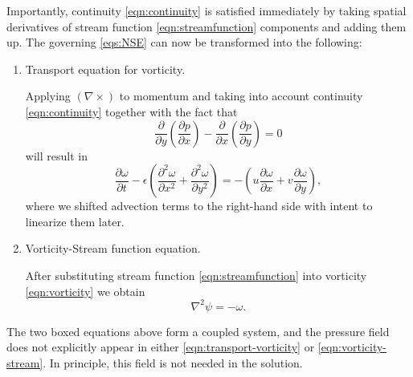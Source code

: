 \documentclass{article}
\numberwithin{equation}{section}
\begin{document}
	Importantly, continuity \cref{eqn:continuity} is satisfied immediately by taking spatial derivatives of stream function \cref{eqn:streamfunction} components and adding them up. The governing \cref{eqs:NSE} can now be transformed into the following:
	\begin{enumerate}
		\item 
			Transport equation for vorticity.
			
			Applying $(\nabla \times)$ to momentum and taking into account continuity \cref{eqn:continuity} together with the fact that
			\begin{equation}
				\frac{\partial}{\partial y}\left(\frac{\partial p}{\partial x}\right) - 
				\frac{\partial}{\partial x}\left(\frac{\partial p}{\partial y}\right)=0
			\end{equation}
			will result in
			\begin{equation}
			\label{eqn:transport-vorticity}
				\boxed{
				\frac{\partial\omega}{\partial t} -\epsilon \left(\frac{\partial ^2 \omega}{\partial x^2} 
				+ \frac{\partial^2 \omega}{\partial y^2} \right)
				=-\left( u \frac{\partial\omega}{\partial x} 
				+ v\frac{\partial\omega}{\partial y}\right),
				}
			\end{equation}
			where we shifted advection terms to the right-hand side with intent to linearize them later.
		\item 
		Vorticity-Stream function equation.
		
		After substituting stream function \cref{eqn:streamfunction} into vorticity \cref{eqn:vorticity} we obtain
		\begin{equation}
			\label{eqn:vorticity-stream}
			\boxed{\nabla ^2 \psi = -\omega.}
		\end{equation}	
	\end{enumerate}
	
	The two boxed equations above form a coupled system, and the pressure field does not explicitly appear in either \cref{eqn:transport-vorticity} or \cref{eqn:vorticity-stream}. In principle, this field is not needed in the solution.
	
\end{document}
